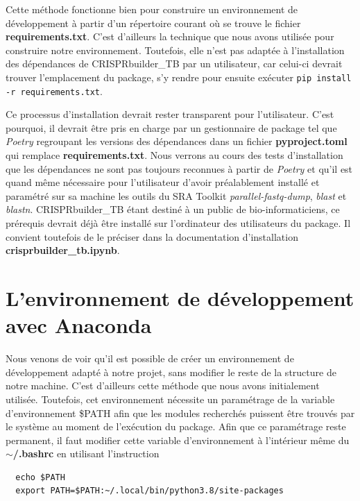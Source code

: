 \documentclass[twoside,a4paper,11pt,frenchb,openany]{report}
\begin{document}
Cette méthode fonctionne bien pour construire un environnement de développement à partir d'un répertoire courant où se trouve le fichier \textbf{requirements.txt}. C'est d'ailleurs la technique que nous avons utilisée pour construire notre environnement. Toutefois, elle n'est pas adaptée à l'installation des dépendances de CRISPRbuilder\_TB par un utilisateur,  car celui-ci devrait trouver l'emplacement du package, s'y rendre pour ensuite exécuter \texttt{pip install -r requirements.txt}.

Ce processus d'installation devrait rester transparent pour l'utilisateur. C'est pourquoi, il devrait être pris en charge par un gestionnaire de package tel que \textit{Poetry} regroupant les versions des dépendances dans un fichier \textbf{pyproject.toml} qui remplace \textbf{requirements.txt}. Nous verrons au cours des tests d'installation que les dépendances ne sont pas toujours reconnues à partir de \textit{Poetry} et qu'il est quand même nécessaire pour l'utilisateur d'avoir préalablement installé et paramétré sur sa machine les outils du SRA Toolkit \textit{parallel-fastq-dump}, \textit{blast} et \textit{blastn}. CRISPRbuilder\_TB étant destiné à un public de bio-informaticiens, ce prérequis devrait déjà être installé sur l'ordinateur des utilisateurs du package. Il convient toutefois de le préciser dans la documentation d'installation \textbf{crisprbuilder\_tb.ipynb}.





\section{L'environnement de développement avec Anaconda}

Nous venons de voir qu'il est possible de créer un environnement de développement adapté à notre projet, sans modifier le reste de la structure de notre machine. C'est d'ailleurs cette méthode que nous avons initialement utilisée. Toutefois, cet environnement nécessite un paramétrage de la variable d'environnement \$PATH afin que les modules recherchés puissent être trouvés par le système au moment de l'exécution du package. Afin que ce paramétrage reste permanent, il faut modifier cette variable d'environnement à l'intérieur même du \textbf{$\sim$/.bashrc} en utilisant l'instruction

\begin{verbatim}
  echo $PATH
  export PATH=$PATH:~/.local/bin/python3.8/site-packages
\end{verbatim}
\end{document}
